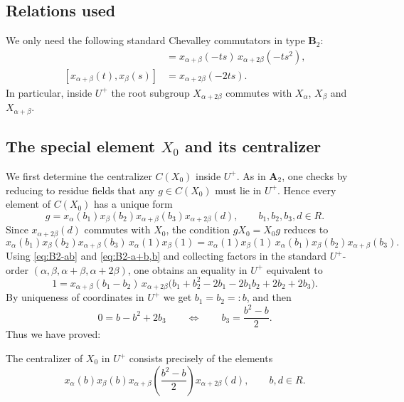 \documentclass[]{jgcc}
\numberwithin{equation}{section}
\begin{document}
\subsection{Relations used}
We only need the following standard Chevalley commutators in type $\mathbf B_2$:
\begin{align}
[x_\alpha(t),x_\beta(s)]
&=x_{\alpha+\beta}(-ts)\,x_{\alpha+2\beta}(-ts^2), \label{eq:B2-ab}\\
[x_{\alpha+\beta}(t),x_\beta(s)]
&=x_{\alpha+2\beta}(-2ts). \label{eq:B2-a+b,b}
\end{align}
In particular, inside $U^+$ the root subgroup $X_{\alpha+2\beta}$ commutes with
$X_\alpha$, $X_\beta$ and $X_{\alpha+\beta}$.

\subsection{\texorpdfstring{The special element $X_0$ and its centralizer}{The special element X0 and its centralizer}}

We first determine the centralizer $C(X_0)$ inside $U^+$.
As in $\mathbf A_2$, one checks by reducing to residue fields that any $g\in C(X_0)$ must lie in $U^+$.
Hence every element of $C(X_0)$ has a unique form
\[
g=x_\alpha(b_1)x_\beta(b_2)x_{\alpha+\beta}(b_3)x_{\alpha+2\beta}(d),
\qquad b_1,b_2,b_3,d\in R.
\]
Since $x_{\alpha+2\beta}(d)$ commutes with $X_0$, the condition $gX_0=X_0g$ reduces to
\begin{equation}\label{eq:B2-cent-start}
x_\alpha(b_1)x_\beta(b_2)x_{\alpha+\beta}(b_3)\,x_\alpha(1)x_\beta(1)
=
x_\alpha(1)x_\beta(1)\,x_\alpha(b_1)x_\beta(b_2)x_{\alpha+\beta}(b_3).
\end{equation}
Using \eqref{eq:B2-ab} and \eqref{eq:B2-a+b,b} and collecting factors in the standard $U^+$-order $(\alpha,\beta,\alpha+\beta,\alpha+2\beta)$,
one obtains an equality in $U^+$ equivalent to
\begin{equation}\label{eq:B2-cent-final}
1=
x_{\alpha+\beta}(b_1-b_2)\,
x_{\alpha+2\beta}\!\bigl(b_1+b_2^2-2b_1-2b_1b_2+2b_2+2b_3\bigr).
\end{equation}
By uniqueness of coordinates in $U^+$ we get $b_1=b_2=:b$, and then
\[
0=b-b^2+2b_3 \qquad\Longleftrightarrow\qquad b_3=\frac{b^2-b}{2}.
\]
Thus we have proved:

\begin{lem}\label{lem:B2-cent}
The centralizer of $X_0$ in $U^+$ consists precisely of the elements
\[
x_\alpha(b)x_\beta(b)x_{\alpha+\beta}\!\left(\frac{b^2-b}{2}\right)x_{\alpha+2\beta}(d),
\qquad b,d\in R.
\]
\end{lem}
\end{document}
